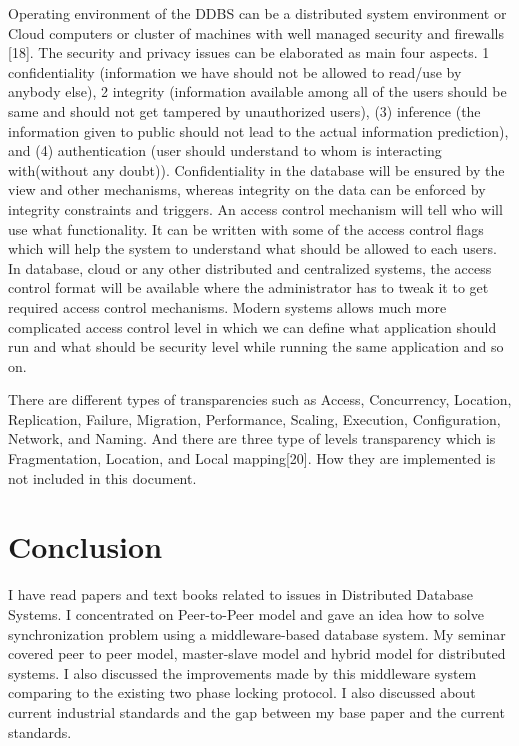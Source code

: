 \documentclass{article}[12pt,a4paper]
\begin{document}
Operating environment of the DDBS can be a distributed system environment or Cloud computers or cluster of machines with well managed security and firewalls [18]. The security and privacy issues can be elaborated as main four aspects. {1} confidentiality (information we have should not be allowed to read/use by anybody else), {2} integrity (information available among all of the users should be same and should not get tampered by unauthorized users), (3) inference (the information given to public should not lead to the actual information prediction), and (4) authentication (user should understand to whom is interacting with(without any doubt)). Confidentiality in the database will be ensured by the view and other mechanisms, whereas integrity on the data can be enforced by integrity constraints and triggers. 
An access control mechanism will tell who will use what functionality. It can be written with some of the access control flags which will help the system to understand what should be allowed to each users. In database, cloud or any other distributed and centralized systems, the access control format will be available where the administrator has to tweak it to get required access control mechanisms. Modern systems allows much more complicated access control level in which we can define what application should run and what should be security level while running the same application and so on.

There are different types of transparencies such as Access, Concurrency, Location, Replication, Failure, Migration, Performance, Scaling, Execution, Configuration, Network, and Naming. And there are three type of levels transparency which is Fragmentation, Location, and Local mapping[20]. How they are implemented is not included in this document.



\section{Conclusion}
I have read papers and text books related to issues in Distributed Database Systems. I concentrated on Peer-to-Peer model and gave an idea how to solve synchronization problem using a middleware-based database system. My seminar covered peer to peer model, master-slave model and hybrid model for distributed systems. I also discussed the improvements made by this middleware system comparing to the existing two phase locking protocol. I also discussed about current industrial standards and the gap between my base paper and the current standards.
\end{document}

